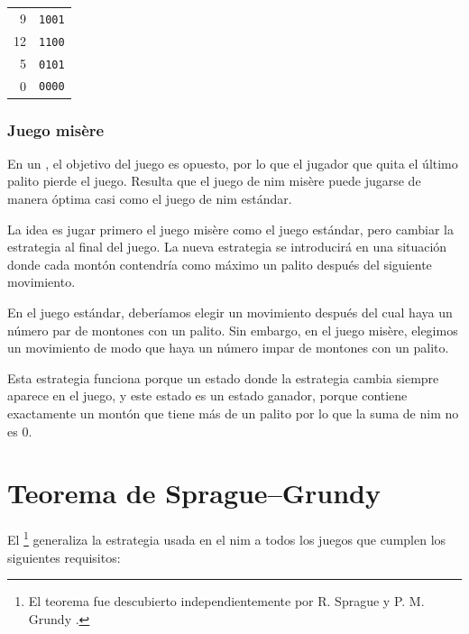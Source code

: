 \begin{center}
\begin{tabular}{r|r}
9 & \texttt{1001} \\
12 & \texttt{1100} \\
5 & \texttt{0101} \\
\hline
0 & \texttt{0000} \\
\end{tabular}
\end{center}

\subsubsection{Juego misère}


En un , el objetivo del juego
es opuesto,
por lo que el jugador que quita el último palito
pierde el juego.
Resulta que el juego de nim misère puede
jugarse de manera óptima casi como el juego de nim estándar.

La idea es jugar primero el juego misère
como el juego estándar, pero cambiar la estrategia
al final del juego.
La nueva estrategia se introducirá en una situación
donde cada montón contendría como máximo un palito
después del siguiente movimiento.

En el juego estándar, deberíamos elegir un movimiento
después del cual haya un número par de montones con un palito.
Sin embargo, en el juego misère, elegimos un movimiento de modo que
haya un número impar de montones con un palito.

Esta estrategia funciona porque un estado donde la
estrategia cambia siempre aparece en el juego,
y este estado es un estado ganador, porque
contiene exactamente un montón que tiene más de un palito
por lo que la suma de nim no es 0.

\section{Teorema de Sprague–Grundy}


El \footnote{El teorema fue
descubierto independientemente por R. Sprague \cite{spr35} y P. M. Grundy \cite{gru39}.} generaliza la
estrategia usada en el nim a todos los juegos que cumplen
los siguientes requisitos:

